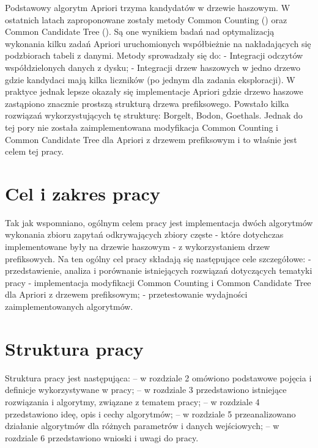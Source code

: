 Podstawowy algorytm Apriori trzyma kandydatów w drzewie haszowym. W ostatnich latach zaproponowane zostały metody Common Counting (\cite{WojciechowskiCC}) oraz Common Candidate Tree (\cite{WojciechowskiCCT}). Są one wynikiem badań nad optymalizacją wykonania kilku zadań Apriori uruchomionych współbieżnie na nakładających się podzbiorach tabeli z danymi. Metody sprowadzały się do:\newline
- Integracji odczytów współdzielonych danych z dysku;\newline
- Integracji drzew haszowych w jedno drzewo gdzie kandydaci mają kilka liczników (po jednym dla zadania eksploracji).\newline
W praktyce jednak lepsze okazały się implementacje Apriori gdzie drzewo haszowe zastąpiono znacznie prostszą strukturą drzewa prefiksowego. Powstało kilka rozwiązań wykorzystujących tę strukturę: Borgelt, Bodon, Goethals. Jednak do tej pory nie została zaimplementowana modyfikacja Common Counting i Common Candidate Tree dla Apriori z drzewem prefiksowym i to właśnie jest celem tej pracy. 

\section{Cel i zakres pracy}
\label{c12}

Tak jak wspomniano, ogólnym celem pracy jest implementacja dwóch algorytmów wykonania zbioru zapytań odkrywających zbiory częste - które dotychczas implementowane były na drzewie haszowym - z wykorzystaniem drzew prefiksowych. \newline
Na ten ogólny cel pracy składają się następujące cele szczegółowe:
- przedstawienie, analiza i porównanie istniejących rozwiązań dotyczących tematyki pracy
- implementacja modyfikacji Common Counting i Common Candidate Tree dla Apriori z drzewem prefiksowym;\newline
- przetestowanie wydajności zaimplementowanych algorytmów.\newline
	
\section{Struktura pracy}
\label{c14}   
Struktura pracy jest następująca:\newline
-- w rozdziale 2 omówiono podstawowe pojęcia i definicje wykorzystywane w pracy;\newline
-- w rozdziale 3 przedstawiono istniejące rozwiązania i algorytmy, związane z tematem pracy;\newline
-- w rozdziale 4 przedstawiono ideę, opis i cechy algorytmów;\newline
-- w rozdziale 5 przeanalizowano działanie algorytmów dla różnych parametrów i danych wejściowych;\newline
-- w rozdziale 6 przedstawiono wnioski i uwagi do pracy.